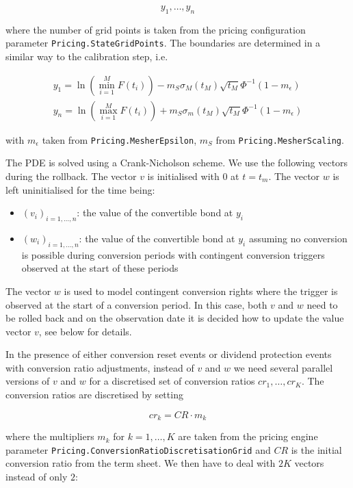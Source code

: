 \begin{equation}
  y_1, \ldots, y_n
\end{equation}

where the number of grid points is taken from the pricing configuration parameter \verb+Pricing.StateGridPoints+. The
boundaries are determined in a similar way to the calibration step, i.e.

\begin{eqnarray}
y_1 = \ln \left( \min_{i=1}^M F(t_i) \right) - m_S \sigma_M(t_M)\sqrt{t_M} \Phi^{-1}(1 - m_\epsilon) \\
y_n = \ln \left( \max_{i=1}^M F(t_i) \right) + m_S \sigma_m(t_M)\sqrt{t_M} \Phi^{-1}(1 - m_\epsilon)
\end{eqnarray}

with $m_\epsilon$ taken from \verb+Pricing.MesherEpsilon+, $m_S$ from \verb+Pricing.MesherScaling+.

The PDE is solved using a Crank-Nicholson scheme. We use the following vectors during the rollback. The vector $v$ is
initialised with $0$ at $t=t_m$. The vector $w$ is left uninitialised for the time being:

\begin{itemize}
\item $(v_i)_{i=1,\ldots,n}$: the value of the convertible bond at $y_i$
\item $(w_i)_{i=1,\ldots,n}$: the value of the convertible bond at $y_i$ assuming no conversion is possible during
  conversion periods with contingent conversion triggers observed at the start of these periods
\end{itemize}

The vector $w$ is used to model contingent conversion rights where the trigger is observed at the start of a conversion
period. In this case, both $v$ and $w$ need to be rolled back and on the observation date it is decided how to update
the value vector $v$, see below for details.

In the presence of either conversion reset events or dividend protection events with conversion ratio adjustments,
instead of $v$ and $w$ we need several parallel versions of $v$ and $w$ for a discretised set of conversion ratios
$cr_1,\ldots,cr_K$. The conversion ratios are discretised by setting

\begin{equation}
  cr_k = CR \cdot m_k
\end{equation}

where the multipliers $m_k$ for $k=1,\ldots,K$ are taken from the pricing engine parameter
\verb+Pricing.ConversionRatioDiscretisationGrid+ and $CR$ is the initial conversion ratio from the term sheet. We then
have to deal with $2K$ vectors instead of only $2$:

